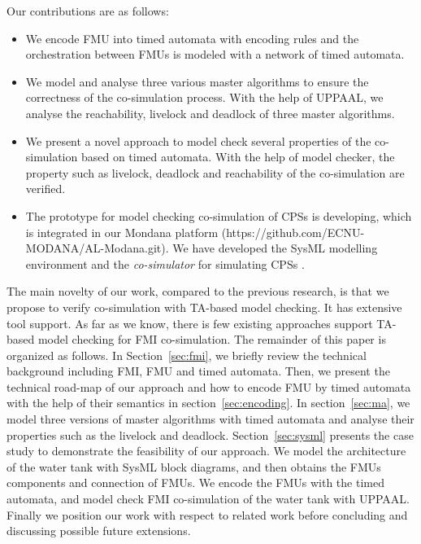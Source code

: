 Our contributions are as follows:
\begin{itemize}
\item
We encode FMU into timed automata with encoding rules and the orchestration between FMUs is modeled with a network of timed automata. 
\item
We model and analyse three various master algorithms to ensure the correctness of the co-simulation process. With the help of UPPAAL, we analyse the reachability, livelock and deadlock of three master algorithms.
\item
We present a novel approach to model check several properties of the co-simulation based on timed automata. With the help of model checker, the property such as livelock, deadlock and reachability of the co-simulation are verified. 
\item
The prototype for model checking co-simulation of CPSs is developing, which is integrated in our Mondana platform \cite{Cheng2015Modana}(https://github.com/ECNU-MODANA/AL-Modana.git). We have developed the SysML modelling environment and the \textit{co-simulator} for simulating CPSs \cite{Fritzson1998Modelica}.
\end{itemize}
The main novelty of our work, compared to the previous research, is that we propose to verify co-simulation with TA-based model checking. It has extensive tool support. As far as we know, there is few existing approaches support TA-based model checking for FMI co-simulation.
The remainder of this paper is organized as follows. In Section~\ref{sec:fmi}, we briefly review the technical background including FMI, FMU and timed automata. Then, we present the technical road-map of our approach and how to encode FMU by timed automata with the help of their semantics in section~\ref{sec:encoding}.
In section~\ref{sec:ma}, we model three versions of master algorithms with timed automata and analyse their properties such as the livelock and deadlock.
Section~\ref{sec:sysml} presents the case study to demonstrate the feasibility of our approach. We model the architecture of the water tank with SysML block diagrams, and then obtains the FMUs components and connection of FMUs. We encode the FMUs with the timed automata, and model check FMI co-simulation of the water tank with UPPAAL. Finally we position our work with respect to related work before concluding and discussing possible future extensions.





















